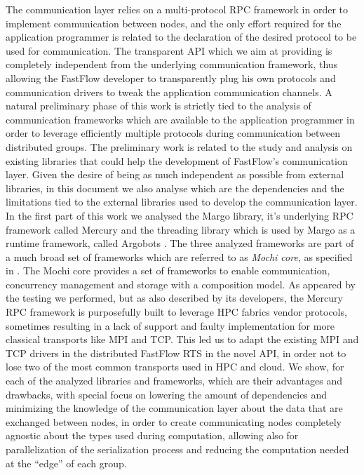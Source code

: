 \documentclass[12pt]{article}
\begin{document}
The communication layer relies on a multi-protocol RPC framework in order to implement communication between nodes, and the only effort required for the application programmer is related to the declaration of the desired protocol to be used for communication. The transparent API which we aim at providing is completely independent from the underlying communication framework, thus allowing the FastFlow developer to transparently plug his own protocols and communication drivers to tweak the application communication channels. A natural preliminary phase of this work is strictly tied to the analysis of communication frameworks which are available to the application programmer in order to leverage efficiently multiple protocols during communication between distributed groups. The preliminary work is related to the study and analysis on existing libraries that could help the development of FastFlow's communication layer. Given the desire of being as much independent as possible from external libraries, in this document we also analyse which are the dependencies and the limitations tied to the external libraries used to develop the communication layer. In the first part of this work we analysed the Margo \cite{mochi-core} library, it's underlying RPC framework called Mercury \cite{mochi-core, mercury} and the threading library which is used by Margo as a runtime framework, called Argobots \cite{argobots-paper}. The three analyzed frameworks are part of a much broad set of frameworks which are referred to as \textit{Mochi core}, as specified in \cite{mochi-core}.  The Mochi core provides a set of frameworks to enable communication, concurrency management and storage with a composition model. As appeared by the testing we performed, but as also described by its developers, the Mercury RPC framework is purposefully built to leverage HPC fabrics vendor protocols, sometimes resulting in a lack of support and faulty implementation for more classical transports like MPI and TCP. This led us to adapt the existing MPI and TCP drivers in the distributed FastFlow RTS in the novel API, in order not to lose two of the most common transports used in HPC and cloud. We show, for each of the analyzed libraries and frameworks, which are their advantages and drawbacks, with special focus on lowering the amount of dependencies and minimizing the knowledge of the communication layer about the data that are exchanged between nodes, in order to create communicating nodes completely agnostic about the types used during computation, allowing also for parallelization of the serialization process and reducing the computation needed at the ``edge'' of each group.\newline
\end{document}
